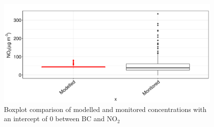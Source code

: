\begin{figure}[H]
\centering
\includegraphics[scale=0.4]{images/grouped_journey_boxplots_new_intercept.png}
\caption{Boxplot comparison of modelled and monitored concentrations with an intercept of 0 between BC and NO$_{2}$}
\label{fig:grouped_journey_boxplots_new_intercept}
\end{figure}

